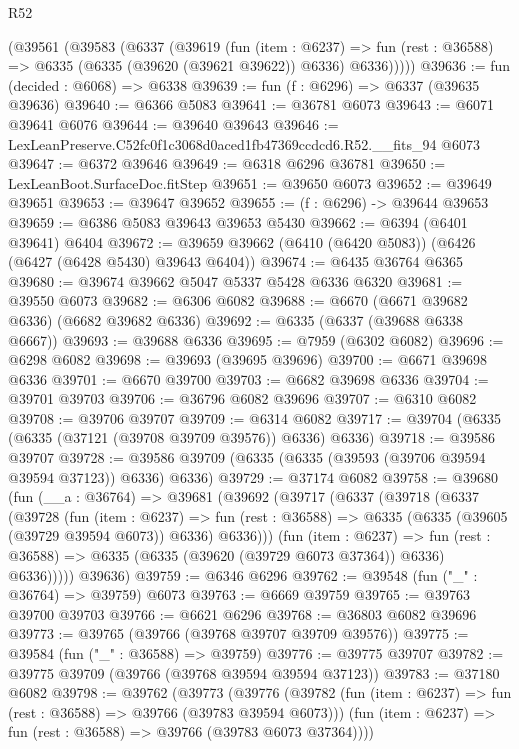 \begin{lexlean}{R52}
\begin{coremodule}
    (@39561
      (@39583
        (@6337
          (@39619
            (fun (item : @6237) =>
            fun (rest : @36588) => @6335 (@6335 (@39620 (@39621 @39622)) @6336) @6336)))))
@39636 := fun (decided : @6068) => @6338
@39639 := fun (f : @6296) => @6337 (@39635 @39636)
@39640 := @6366 @5083
@39641 := @36781 @6073
@39643 := @6071 @39641 @6076
@39644 := @39640 @39643
@39646 := LexLeanPreserve.C52fc0f1c3068d0aced1fb47369ccdcd6.R52.__fits_94 @6073
@39647 := @6372 @39646
@39649 := @6318 @6296 @36781
@39650 := LexLeanBoot.SurfaceDoc.fitStep
@39651 := @39650 @6073
@39652 := @39649 @39651
@39653 := @39647 @39652
@39655 := (f : @6296) -> @39644 @39653
@39659 := @6386 @5083 @39643 @39653 @5430
@39662 := @6394 (@6401 @39641) @6404
@39672 := @39659 @39662 (@6410 (@6420 @5083)) (@6426 (@6427 (@6428 @5430) @39643 @6404))
@39674 := @6435 @36764 @6365
@39680 := @39674 @39662 @5047 @5337 @5428 @6336 @6320
@39681 := @39550 @6073
@39682 := @6306 @6082
@39688 := @6670 (@6671 @39682 @6336) (@6682 @39682 @6336)
@39692 := @6335 (@6337 (@39688 @6338 @6667))
@39693 := @39688 @6336
@39695 := @7959 (@6302 @6082)
@39696 := @6298 @6082
@39698 := @39693 (@39695 @39696)
@39700 := @6671 @39698 @6336
@39701 := @6670 @39700
@39703 := @6682 @39698 @6336
@39704 := @39701 @39703
@39706 := @36796 @6082 @39696
@39707 := @6310 @6082
@39708 := @39706 @39707
@39709 := @6314 @6082
@39717 := @39704 (@6335 (@6335 (@37121 (@39708 @39709 @39576)) @6336) @6336)
@39718 := @39586 @39707
@39728 := @39586 @39709 (@6335 (@6335 (@39593 (@39706 @39594 @39594 @37123)) @6336) @6336)
@39729 := @37174 @6082
@39758 := @39680
    (fun (__a : @36764) =>
    @39681
      (@39692
        (@39717
          (@6337
            (@39718
              (@6337
                (@39728
                  (fun (item : @6237) =>
                  fun (rest : @36588) => @6335 (@6335 (@39605 (@39729 @39594 @6073)) @6336) @6336)))
              (fun (item : @6237) =>
              fun (rest : @36588) => @6335 (@6335 (@39620 (@39729 @6073 @37364)) @6336) @6336)))))
      @39636)
@39759 := @6346 @6296
@39762 := @39548 (fun ("_" : @36764) => @39759) @6073
@39763 := @6669 @39759
@39765 := @39763 @39700 @39703
@39766 := @6621 @6296
@39768 := @36803 @6082 @39696
@39773 := @39765 (@39766 (@39768 @39707 @39709 @39576))
@39775 := @39584 (fun ("_" : @36588) => @39759)
@39776 := @39775 @39707
@39782 := @39775 @39709 (@39766 (@39768 @39594 @39594 @37123))
@39783 := @37180 @6082
@39798 := @39762
    (@39773
      (@39776
        (@39782 (fun (item : @6237) => fun (rest : @36588) => @39766 (@39783 @39594 @6073)))
        (fun (item : @6237) => fun (rest : @36588) => @39766 (@39783 @6073 @37364))))

\end{coremodule}
\end{lexlean}
